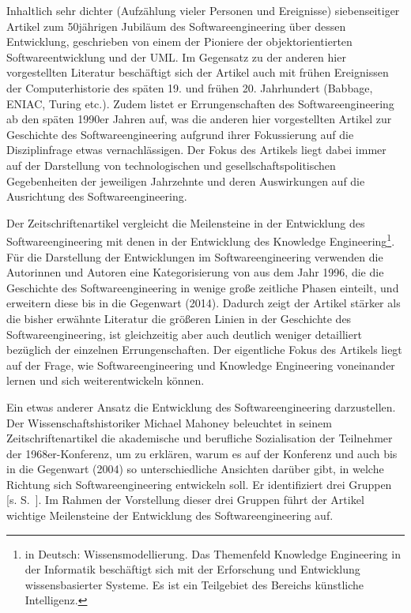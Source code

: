 {Inhaltlich sehr dichter (Aufzählung vieler Personen und Ereignisse) siebenseitiger Artikel zum 50jährigen Jubiläum des Softwareengineering über dessen Entwicklung, geschrieben von einem der Pioniere der objektorientierten Softwareentwicklung und der UML. Im Gegensatz zu der anderen hier vorgestellten Literatur beschäftigt sich der Artikel auch mit frühen Ereignissen der Computerhistorie des späten 19. und frühen 20. Jahrhundert (Babbage, ENIAC, Turing etc.). Zudem listet er Errungenschaften des Softwareengineering ab den späten 1990er Jahren auf, was die anderen hier vorgestellten Artikel zur Geschichte des Softwareengineering aufgrund ihrer Fokussierung auf die Disziplinfrage etwas vernachlässigen. Der Fokus des Artikels liegt dabei immer auf der Darstellung von technologischen und gesellschaftspolitischen Gegebenheiten der jeweiligen Jahrzehnte und deren Auswirkungen auf die Ausrichtung des Softwareengineering.}

{Der Zeitschriftenartikel vergleicht die Meilensteine in der Entwicklung des Softwareengineering mit denen in der Entwicklung des Knowledge Engineering\footnote{in Deutsch: Wissensmodellierung. Das Themenfeld Knowledge Engineering in der Informatik beschäftigt sich mit der Erforschung und Entwicklung wissensbasierter Systeme. Es ist ein Teilgebiet des Bereichs künstliche Intelligenz.}. Für die Darstellung der Entwicklungen im Softwareengineering verwenden die Autorinnen und Autoren eine Kategorisierung von \cite{end97} aus dem Jahr 1996, die die Geschichte des Softwareengineering in wenige große zeitliche Phasen einteilt, und erweitern diese bis in die Gegenwart (2014). Dadurch zeigt der Artikel stärker als die bisher erwähnte Literatur die größeren Linien in der Geschichte des Softwareengineering, ist gleichzeitig aber auch deutlich weniger detailliert bezüglich der einzelnen Errungenschaften. Der eigentliche Fokus des Artikels liegt auf der Frage, wie Softwareengineering und Knowledge Engineering voneinander lernen und sich weiterentwickeln können.}

{Ein etwas anderer Ansatz die Entwicklung des Softwareengineering darzustellen. Der Wissenschaftshistoriker Michael Mahoney beleuchtet in seinem Zeitschriftenartikel die akademische und berufliche Sozialisation der Teilnehmer der 1968er-Konferenz, um zu erklären, warum es auf der Konferenz und auch bis in die Gegenwart (2004) so unterschiedliche Ansichten darüber gibt, in welche Richtung sich Softwareengineering entwickeln soll. Er identifiziert drei Gruppen [s. S.~\pageref{text:Mahoney}]. Im Rahmen der Vorstellung dieser drei Gruppen führt der Artikel wichtige Meilensteine der Entwicklung des Softwareengineering auf.}

